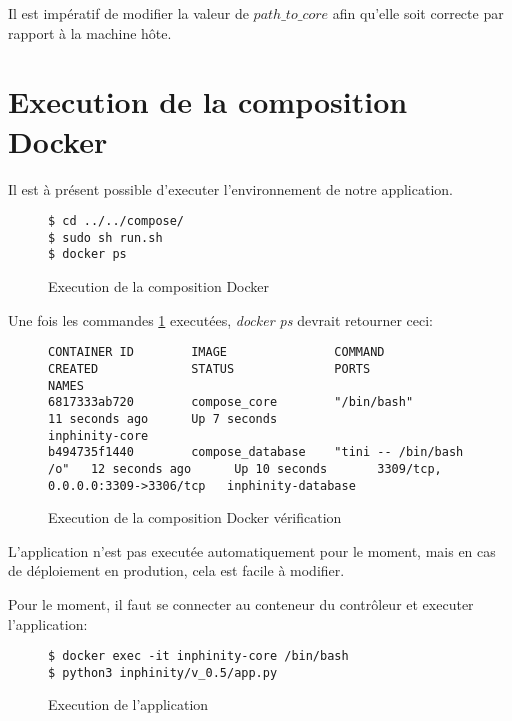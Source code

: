 Il est impératif de modifier la valeur de \emph{$path\_to\_core$} afin qu’elle soit correcte par rapport à la machine hôte.

\section{Execution de la composition Docker}

Il est à présent possible d'executer l'environnement de notre application.

\begin{figure}[H] 
\centering 
\begin{lstlisting}[frame=single]
$ cd ../../compose/
$ sudo sh run.sh
$ docker ps
\end{lstlisting} 
\caption[Code - Execution composition]{Execution de la composition Docker}
\label{fig:execCompose} 
\end{figure}

Une fois les commandes \ref{fig:execCompose} executées, \emph{docker ps} devrait retourner ceci:

\begin{figure}[H] 
\centering 
\begin{lstlisting}[frame=single]
CONTAINER ID        IMAGE               COMMAND                  CREATED             STATUS              PORTS                              NAMES
6817333ab720        compose_core        "/bin/bash"              11 seconds ago      Up 7 seconds                                           inphinity-core
b494735f1440        compose_database    "tini -- /bin/bash /o"   12 seconds ago      Up 10 seconds       3309/tcp, 0.0.0.0:3309->3306/tcp   inphinity-database
\end{lstlisting} 
\caption[Code - Execution composition vérification]{Execution de la composition Docker vérification}
\label{fig:execComposeCheck} 
\end{figure}

L'application n'est pas executée automatiquement pour le moment, mais en cas de déploiement en prodution, cela est facile à modifier.

Pour le moment, il faut se connecter au conteneur du contrôleur et executer l'application:

\begin{figure}[H] 
\centering 
\begin{lstlisting}[frame=single]
$ docker exec -it inphinity-core /bin/bash
$ python3 inphinity/v_0.5/app.py 
\end{lstlisting} 
\caption[Code - Execution Application]{Execution de l'application}
\label{fig:execComposeCheck} 
\end{figure}



















